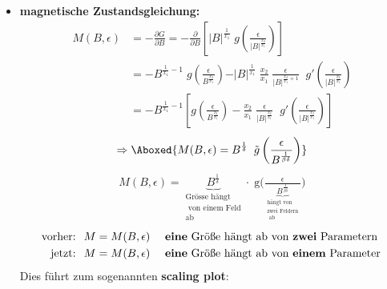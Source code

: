 \documentclass[12pt]{article}
\begin{document}
\begin{itemize}
\item \textbf{magnetische Zustandsgleichung:}
\begin{align}
M(B,\epsilon)& = - \frac{\partial G}{\partial B} = - \frac{\partial}{\partial B} \left[ \vert B \vert ^\frac{1}{x_1} \; g\left( \frac{\epsilon}{\vert B \vert ^\frac{x_2}{x_1}} \right) \right] \\
&= - B^{\frac{1}{x_1}-1} \; g\left( \frac{\epsilon}{B^\frac{x_2}{x_1}}\right) - \vert B \vert ^\frac{1}{x_1} \; \frac{x_2}{x_1} \; \frac{\epsilon}{\vert B \vert ^{\frac{x_2}{x_1}+1} }  \; \; g'\left( \frac{\epsilon}{\vert B \vert ^\frac{x_2}{x_1} }\right) \\
&= - B^{\frac{1}{x_1}-1} \left[ 
g\left( \frac{\epsilon}{B^\frac{x_2}{x_1}}\right) 
- \frac{x_2}{x_1} \; \frac{\epsilon}{\vert B \vert ^{\frac{x_2}{x_1}} } \; \;g'\left( \frac{\epsilon}{\vert B \vert ^\frac{x_2}{x_1} }\right) \right] 
\end{align}
\begin{align}
\Rightarrow \Aboxed{M(B,\epsilon)= B^\frac{1}{\delta} \; \; \tilde{g} \left( \frac{\epsilon}{B^\frac{1}{\beta \delta}} \right)  } \label{Magnetisierung}
\end{align}
\begin{align}
M(B,\epsilon)
= \underbrace{B^\frac{1}{\delta}}_{ \substack{ \text{Grösse hängt} \\ \text{ von einem Feld} \\ \text{ab}}} \cdot \; \text{\~{g}} \Big( \frac{\epsilon}{\underbrace{ B^\frac{1}{\beta \delta}}_{ \substack{ \text{hängt von} \\ \text{zwei Feldern} \\ \text{ ab}}}} \Big) 
\end{align} 
\begin{align*}
\mbox{vorher: } \; & M = M(B,\epsilon) \quad \text{ \textbf{eine} Größe hängt ab von \textbf{zwei} Parametern }\\
\mbox{jetzt: }\; & M = M(B,\epsilon) \quad \text{ \textbf{eine} Größe hängt ab von \textbf{einem} Parameter}
\end{align*}
Dies führt zum sogenannten \textbf{scaling plot}: \\



\end{itemize}
\end{document}
